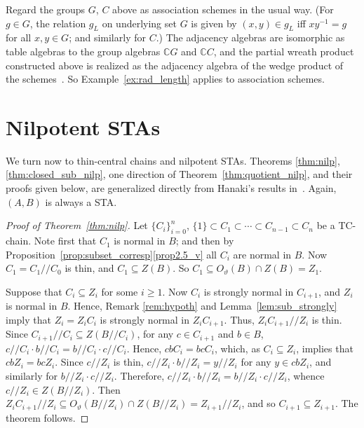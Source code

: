 \documentclass[ALCO,ThmDefs,Unicode,epreuves]{cedram}
\newcommand{\C}{{\mathbb C}}
\begin{document}
\begin{rema}
\label{rem:rad_length} 
Regard the groups $G$, $C$ above as association
schemes in the usual way. (For $g \in G$, the relation $g_L$ on
underlying set $G$ is given by $(x, y) \in g_L$ iff $xy^{-1} = g$ for
all $x, y \in G$; and similarly for $C$.) The adjacency algebras are
isomorphic as table algebras to the group algebras ${\C}G$ and ${\C}C$,
and the partial wreath product constructed above is realized as the
adjacency algebra of the wedge product of the schemes~\cite [Section~3]{M}. 
 So Example~\ref{ex:rad_length} applies to
association schemes.
\end{rema}



\section{Nilpotent STAs}\label{sect5}

We turn now to thin-central chains and nilpotent STAs. Theorems
\ref{thm:nilp}, \ref{thm:closed_sub_nilp}, one direction of Theorem~\ref{thm:quotient_nilp}, and
their proofs given below, are generalized directly from Hanaki's results
in~\cite {H}. Again, 
$(A, B)$ is always a STA.

\begin{proof} [Proof of Theorem~\ref{thm:nilp}]
Let $\{C_i\}_{i=0}^n$, $\{1\} \subset C_1 \subset \cdots \subset C_{n-1}
\subset C_n$ be a TC-chain. Note first that $C_1$ is normal in $B$; and
then by Proposition~\ref{prop:subset_corresp}\ref{prop2.5_v} all $C_i$ are normal
in $B$. Now $C_1 = C_1//C_0$ is thin, and $C_1 \subseteq Z(B)$. So
$C_1 \subseteq O_{\vartheta}(B)\cap Z(B) = Z_1$. 

Suppose that $C_i \subseteq Z_i$ for some $i \geq 1$. Now $C_i$ is
strongly normal in $C_{i+1}$, and $Z_i$ is normal in $B$. Hence, Remark
\ref{rem:hypoth} and Lemma~\ref{lem:sub_strongly} imply that $Z_i =
Z_iC_i$ is strongly normal in $Z_iC_{i+1}$. Thus, $Z_iC_{i+1}//Z_i$ is thin.
Since $C_{i+1}//C_i \subseteq Z(B//C_i)$, for any $c \in C_{i+1}$ and $b
\in B$, $c//C_i\cdot b//C_i = b//C_i\cdot c//C_i$. Hence, $cbC_i = bcC_i$, which,
as $C_i \subseteq Z_i$, implies that $cbZ_i = bcZ_i$. Since $c//Z_i$ is
thin, $c//Z_i\cdot b//Z_i = y//Z_i$ for any $y \in cbZ_i$, and similarly
for $b//Z_i\cdot c//Z_i$. Therefore, 
$c//Z_i\cdot b//Z_i = b//Z_i\cdot c//Z_i$, whence $c//Z_i \in Z(B//Z_i)$. Then
$Z_iC_{i+1}//Z_i \subseteq O_{\vartheta}(B//Z_i)\cap Z(B//Z_i) =
Z_{i+1}//Z_i$, and so $C_{i+1} \subseteq Z_{i+1}$. The theorem follows.
\end{proof} 
\end{document}
